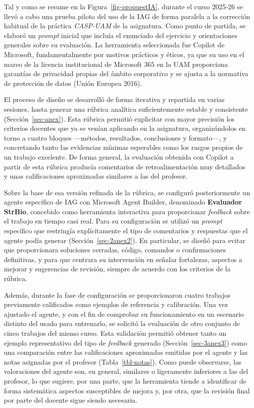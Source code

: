 \documentclass[
  11pt,
  a4paper,
  twoside]{scrreprt}
\begin{document}
Tal y como se resume en la Figura~\ref{fig-propuestIA}, durante el curso
2025-26 se llevó a cabo una prueba piloto del uso de la IAG de forma
paralela a la corrección habitual de la práctica \emph{CASP-UAM} de la
asignatura. Como punto de partida, se elaboró un \emph{prompt} inicial
que incluía el enunciado del ejercicio y orientaciones generales sobre
su evaluación. La herramienta seleccionada fue Copilot de Microsoft,
fundamentalmente por motivos prácticos y éticos, ya que su uso en el
marco de la licencia institucional de Microsoft 365 en la UAM
proporciona garantías de privacidad propias del ámbito corporativo y se
ajusta a la normativa de protección de datos (Unión Europea 2016).

El proceso de diseño se desarrolló de forma iterativa y repartida en
varias sesiones, hasta generar una rúbrica analítica suficientemente
estable y consistente (Sección~\ref{sec-anex}). Esta rúbrica permitió
explicitar con mayor precisión los criterios docentes que ya se venían
aplicando en la asignatura, organizándolos en torno a cuatro bloques
---métodos, resultados, conclusiones y formato---, y concretando tanto
las evidencias mínimas esperables como los rasgos propios de un trabajo
excelente. De forma general, la evaluación obtenida con Copilot a partir
de esta rúbrica producía comentarios de retroalimentación muy detallados
y unas calificaciones aproximadas similares a las del profesor.

Sobre la base de esa versión refinada de la rúbrica, se configuró
posteriormente un agente específico de IAG con Microsoft Agent Builder,
denominado \textbf{Evaluador StrBio}, concebido como herramienta
interactiva para proporcionar \emph{feedback} sobre el trabajo en tiempo
casi real. Para su configuración se utilizó un \emph{prompt} específico
que restringía explícitamente el tipo de comentarios y respuestas que el
agente podía generar (Sección~\ref{sec-2anex2}). En particular, se
diseñó para evitar que proporcionara soluciones cerradas, código,
comandos o confirmaciones definitivas, y para que centrara su
intervención en señalar fortalezas, aspectos a mejorar y sugerencias de
revisión, siempre de acuerdo con los criterios de la rúbrica.

Además, durante la fase de configuración se proporcionaron cuatro
trabajos previamente calificados como ejemplos de referencia y
calibración. Una vez ajustado el agente, y con el fin de comprobar su
funcionamiento en un escenario distinto del usado para entrenarlo, se
solicitó la evaluación de otro conjunto de cinco trabajos del mismo
curso. Esta validación permitió obtener tanto un ejemplo representativo
del tipo de \emph{feedback} generado (Sección~\ref{sec-3anex3}) como una
comparación entre las calificaciones aproximadas emitidas por el agente
y las notas asignadas por el profesor (Tabla~\ref{tbl-notas}). Como
puede observarse, las valoraciones del agente son, en general, similares
o ligeramente inferiores a las del profesor, lo que sugiere, por una
parte, que la herramienta tiende a identificar de forma sistemática
aspectos susceptibles de mejora y, por otra, que la revisión final por
parte del docente sigue siendo necesaria.
\end{document}
